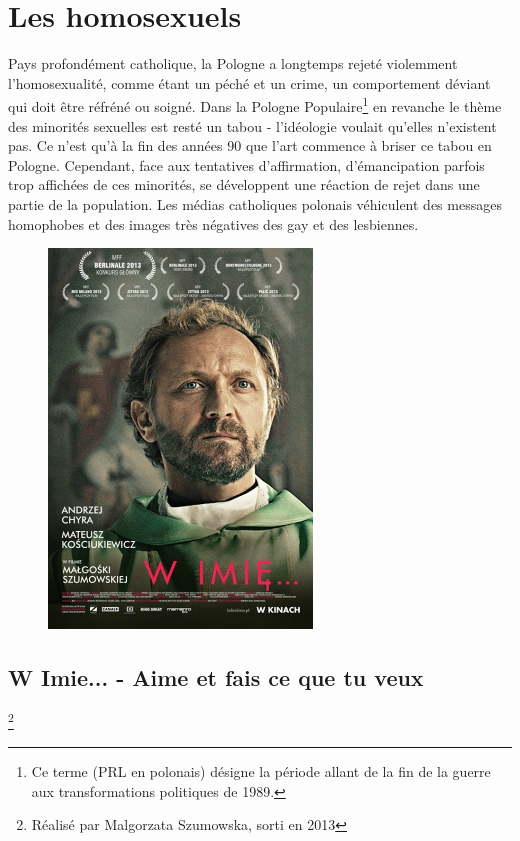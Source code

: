 \documentclass[12pt, twocolumn]{amsart}
\begin{document}
\section{Les homosexuels}
Pays profondément catholique, la Pologne a longtemps rejeté violemment l’homosexualité, comme étant un péché et un crime, un comportement déviant qui doit être réfréné ou soigné. Dans la Pologne Populaire\footnote{Ce terme (PRL en polonais) désigne la période allant de la fin de la guerre aux transformations politiques de 1989.} en revanche le thème des minorités sexuelles est resté un tabou - l'idéologie voulait qu'elles n'existent pas. Ce n'est qu'à la fin des années 90 que l'art commence à briser ce tabou en Pologne. Cependant, face aux tentatives d'affirmation, d'émancipation parfois trop affichées de ces minorités, se développent une réaction de rejet dans une partie de la population. Les médias catholiques polonais véhiculent des messages homophobes et des images très négatives des gay et des lesbiennes.
\begin{figure}

\includegraphics[width=7cm]{wimie.jpg}

\end{figure}


\subsection*{W Imie... - Aime et fais ce que tu veux}\footnote{Réalisé par Malgorzata Szumowska, sorti en 2013}
\end{document}
